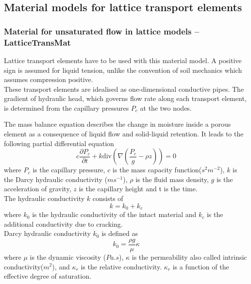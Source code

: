\documentclass[a4paper]{article}
\begin{document}
\subsection{Material models for lattice transport elements}

\subsubsection{Material for unsaturated flow in lattice models -- LatticeTransMat}

\label{latticetransmat}

Lattice transport elements have to be used with this material model. A positive sign is assumed for liquid tension, unlike the convention of soil mechanics which assumes compression positive.\\

These transport elements are idealised as one-dimensional conductive pipes. The gradient of hydraulic head, which governs flow rate along each transport element, is determined from the capillary pressures $P_{c}$ at the two nodes.

The mass balance equation describes the change in moisture inside a porous element as a consequence of liquid flow and solid-liquid retention. It leads to the following partial differential equation
\begin{equation}\label{latticetransmat1}
c\frac{\partial P_{c}}{\partial t} + k\mbox{div}(\nabla(\frac{P_{c}}{g}-\rho z)) =0
\end{equation}
where $P_{c}$ is the capillary pressure, $c$ is the mass capacity function($s^{2}m^{-2}$), $k$ is the Darcy hydraulic conductivity ($ms^{-1}$), $\rho$ is the fluid mass density, $g$ is the acceleration of gravity, $z$ is the capillary height and t is the time.\\

The hydraulic conductivity $k$ consists of
\begin{equation}\label{latticetransmat11}
k=k_{0} + k_{c}
\end{equation}
where $k_{0} $ is the hydraulic conductivity of the intact material and $k_{c} $ is the additional conductivity due to cracking.\\

Darcy hydraulic conductivity $k_{0}$ is defined as 
\begin{equation}\label{latticetransmat12}
k_{0}=\frac{\rho g}{\mu}\kappa
\end{equation}
where $\mu$ is the dynamic viscosity ($Pa.s$), $\kappa$ is the permeability also called intrinsic conductivity($m^{2}$), and $\kappa_{r}$ is the relative conductivity. $\kappa_{r}$ is a function of the effective degree of saturation.\\
\end{document}
